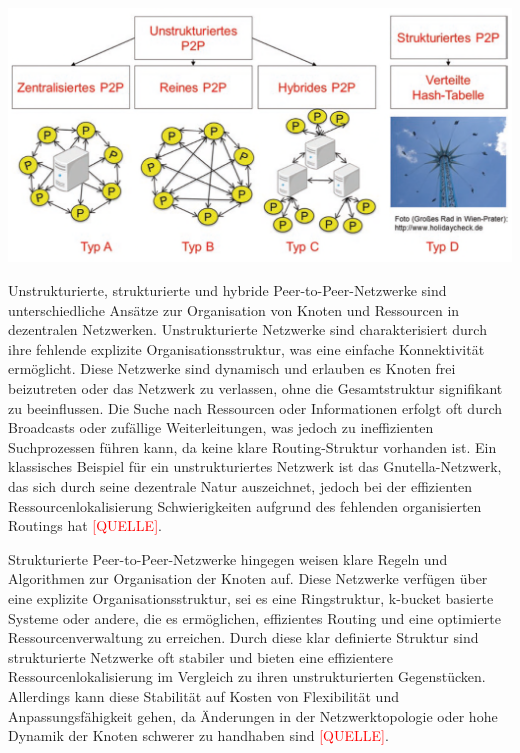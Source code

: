 \begin{center}
    \captionsetup{type=figure}
    \includegraphics[width=1\linewidth]{images/peer_to_peer_typen.png}
    \label{p2p_typen}
\end{center}

\noindent Unstrukturierte, strukturierte und hybride Peer-to-Peer-Netzwerke sind unterschiedliche Ansätze zur Organisation von Knoten und Ressourcen in dezentralen Netzwerken. Unstrukturierte Netzwerke sind charakterisiert durch ihre fehlende explizite Organisationsstruktur, was eine einfache Konnektivität ermöglicht. Diese Netzwerke sind dynamisch und erlauben es Knoten frei beizutreten oder das Netzwerk zu verlassen, ohne die Gesamtstruktur signifikant zu beeinflussen. Die Suche nach Ressourcen oder Informationen erfolgt oft durch Broadcasts oder zufällige Weiterleitungen, was jedoch zu ineffizienten Suchprozessen führen kann, da keine klare Routing-Struktur vorhanden ist. Ein klassisches Beispiel für ein unstrukturiertes Netzwerk ist das Gnutella-Netzwerk, das sich durch seine dezentrale Natur auszeichnet, jedoch bei der effizienten Ressourcenlokalisierung Schwierigkeiten aufgrund des fehlenden organisierten Routings hat \textcolor{red}{[QUELLE]}.

Strukturierte Peer-to-Peer-Netzwerke hingegen weisen klare Regeln und Algorithmen zur Organisation der Knoten auf. Diese Netzwerke verfügen über eine explizite Organisationsstruktur, sei es eine Ringstruktur, k-bucket basierte Systeme oder andere, die es ermöglichen, effizientes Routing und eine optimierte Ressourcenverwaltung zu erreichen. Durch diese klar definierte Struktur sind strukturierte Netzwerke oft stabiler und bieten eine effizientere Ressourcenlokalisierung im Vergleich zu ihren unstrukturierten Gegenstücken. Allerdings kann diese Stabilität auf Kosten von Flexibilität und Anpassungsfähigkeit gehen, da Änderungen in der Netzwerktopologie oder hohe Dynamik der Knoten schwerer zu handhaben sind \textcolor{red}{[QUELLE]}.

